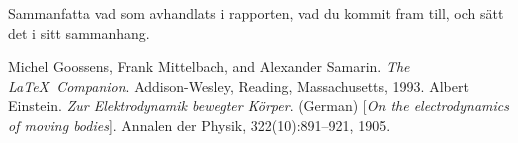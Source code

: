 \documentclass[a4paper,12pt]{article}
\begin{document}
Sammanfatta vad som avhandlats i rapporten, vad du kommit fram till,
och sätt det i sitt sammanhang. 
%
\begin{thebibliography}{99}
%
Michel Goossens, Frank Mittelbach, and Alexander Samarin. 
\textit{The \LaTeX\ Companion}. 
Addison-Wesley, Reading, Massachusetts, 1993.
%
Albert Einstein. 
\textit{Zur Elektrodynamik bewegter K{\"o}rper}. (German) 
[\textit{On the electrodynamics of moving bodies}]. 
Annalen der Physik, 322(10):891–921, 1905.
%
\end{thebibliography}
%
\end{document}

